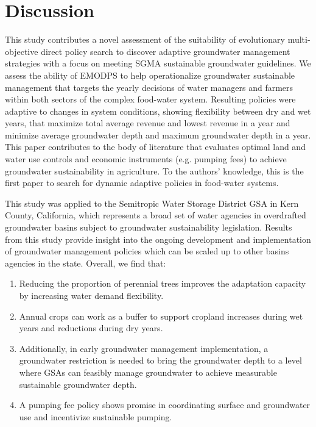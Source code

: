 \documentclass[a4paper,fleqn]{cas-sc}
\begin{document}
\section{Discussion}

This study contributes a novel assessment of the suitability of evolutionary multi-objective direct policy search to discover adaptive groundwater management strategies with a focus on meeting SGMA sustainable groundwater guidelines. We assess the ability of EMODPS to help operationalize groundwater sustainable management that targets the yearly decisions of water managers and farmers within both sectors of the complex food-water system. Resulting policies were adaptive to changes in system conditions, showing flexibility between dry and wet years, that maximize total average revenue and lowest revenue in a year and minimize average groundwater depth and maximum groundwater depth in a year. This paper contributes to the body of literature that evaluates optimal land and water use controls and economic instruments (e.g. pumping fees) to achieve groundwater sustainability in agriculture. To the authors’ knowledge, this is the first paper to search for dynamic adaptive policies in food-water systems.  

This study was applied to the Semitropic Water Storage District GSA in Kern County, California, which represents a broad set of water agencies in overdrafted groundwater basins subject to groundwater sustainability legislation. Results from this study provide insight into the ongoing development and implementation of groundwater management policies which can be scaled up to other basins agencies in the state. Overall, we find that:  

\begin{enumerate}
    \item   Reducing the proportion of perennial trees improves the adaptation capacity by increasing water demand flexibility.  
    \item  Annual crops can work as a buffer to support cropland increases during wet years and reductions during dry years.
    \item  Additionally, in early groundwater management implementation, a groundwater restriction is needed to bring the groundwater depth to a level where GSAs can feasibly manage groundwater to achieve measurable sustainable groundwater depth.
    \item  A pumping fee policy shows promise in coordinating surface and groundwater use and incentivize sustainable pumping. 
\end{enumerate}
\end{document}
